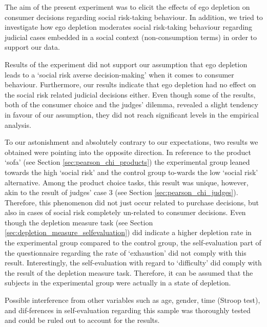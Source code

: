 \onehalfspacing
The aim of the present experiment was to elicit the effects of ego depletion on consumer decisions regarding social risk-taking behaviour. In addition, we tried to investigate how ego depletion moderates social risk-taking behaviour regarding judicial cases embedded in a social context (non-consumption terms) in order to support our data. \par
Results of the experiment did not support our assumption that ego depletion leads to a ‘social risk averse decision-making’ when it comes to consumer behaviour. Furthermore, our results indicate that ego depletion had no effect on the social risk related judicial decisions either. Even though some of the results, both of the consumer choice and the judges’ dilemma, revealed a slight tendency in favour of our assumption, they did not reach significant levels in the empirical analysis. \par
To our astonishment and absolutely contrary to our expectations, two results we obtained were pointing into the opposite direction. In reference to the product ‘sofa’ (see Section \ref{sec:pearson_chi_products}) the experimental group leaned towards the high ‘social risk’ and the control group to-wards the low ‘social risk’ alternative. Among the product choice tasks, this result was unique, however, akin to the result of judges’ case 3 (see Section \ref{sec:pearson_chi_judges}). Therefore, this phenomenon did not just occur related to purchase decisions, but also in cases of social risk completely un-related to consumer decisions. Even though the depletion measure task (see Section \ref{sec:depletion_measure_selfevaluation}) did indicate a higher depletion rate in the experimental group compared to the control group, the self-evaluation part of the questionnaire regarding the rate of ‘exhaustion’ did not comply with this result. Interestingly, the self-evaluation with regard to ‘difficulty’ did comply with the result of the depletion measure task. Therefore, it can be assumed that the subjects in the experimental group were actually in a state of depletion.\par
Possible interference from other variables such as age, gender, time (Stroop test), and dif-ferences in self-evaluation regarding this sample was thoroughly tested and could be ruled out to account for the results. \par
